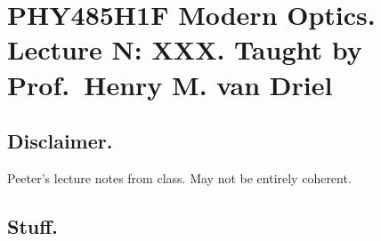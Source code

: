 
%

\chapter{PHY485H1F Modern Optics.  Lecture {N}: XXX.  Taught by Prof.\ Henry M. van Driel}
\label{chap:modernOpticsL{N}}
{}
\date{Sept XX, 2012}

\beginArtWithToc

\section{Disclaimer.}

Peeter's lecture notes from class.  May not be entirely coherent.

\section{Stuff.}

\EndArticle

